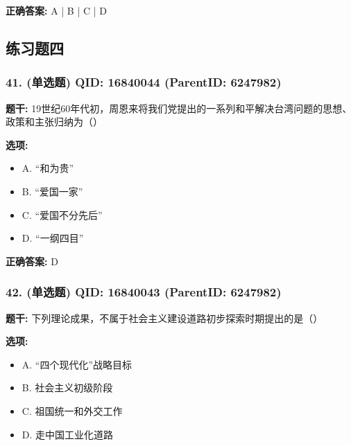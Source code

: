 \documentclass[12pt,UTF8]{ctexart}
\begin{document}
\textbf{正确答案:}
A | B | C | D

\vspace{0.3em}\hrulefill\vspace{0.7em}

\subsection*{练习题四}

\subsubsection*{41. (单选题) \small QID: 16840044 (ParentID: 6247982)}

\textbf{题干:}
19世纪60年代初，周恩来将我们党提出的一系列和平解决台湾问题的思想、政策和主张归纳为（）



\textbf{选项:}
\begin{itemize}[leftmargin=*]

  \item A. “和为贵”

  \item B. “爱国一家”

  \item C. “爱国不分先后”

  \item D. “一纲四目”

\end{itemize}

\textbf{正确答案:}
D

\vspace{0.3em}\hrulefill\vspace{0.7em}

\subsubsection*{42. (单选题) \small QID: 16840043 (ParentID: 6247982)}

\textbf{题干:}
下列理论成果，不属于社会主义建设道路初步探索时期提出的是（）



\textbf{选项:}
\begin{itemize}[leftmargin=*]

  \item A. “四个现代化”战略目标

  \item B. 社会主义初级阶段

  \item C. 祖国统一和外交工作

  \item D. 走中国工业化道路

\end{itemize}
\end{document}
